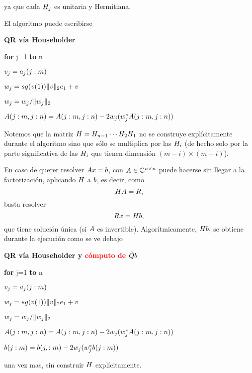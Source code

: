\begin{tcolorbox}
ya que cada $\Hbb_j$ es unitaria y Hermitiana.

El algoritmo puede escribirse

\begin{tcolorbox}[width=\linewidth*4/5]
\begin{center}
{\bf QR vía Householder}

\end{center}

{\bf for} j=1 {\bf to} n

\qquad $\vb_j=\ab_j(j:m)$

\qquad $\wb_j=sg(\vb(1))\|\vb\|_2\eb_1+\vb$

\qquad  $\wb_j=\wb_j/\|\wb_j \|_2$

\qquad  $\Ab(j:m,j:n)= \Ab(j:m,j:n)-2\wb_j(\wb_j^*\Ab(j:m,j:n))$
\end{tcolorbox}
Notemos que la matriz
$\Hbb=\Hbb_{n-1}\cdots \Hbb_2\Hbb_1$ no se construye explícitamente durante el algoritmo sino que sólo se multiplica por las $\Hbb_i$
(de hecho solo por la parte significativa de las  $\Hbb_i$ que tienen dimensión
$(m-i)\times (m-i)$).

En caso de querer resolver $\Ab x=\bb$, con $\Ab\in \Cnn$ puede hacerse sin llegar a la factorización, aplicando $\Hbb$ a $\bb$, es decir, como
$$
\Hbb\Ab=\Rb,
$$
basta resolver
$$
\Rb \xb= \Hbb \bb,
$$
que tiene solución única (si $\Ab$ es invertible). Algorítmicamente, $\Hbb \bb,$ se obtiene durante la ejecución como se ve debajo

\begin{tcolorbox}[width=\linewidth*4/5]
\begin{center}
{\bf QR vía Householder y \textcolor{red}{cómputo de $\tilde \Qb\bb$}}
\end{center}

{\bf for} j=1 {\bf to} n

\qquad $\vb_j=\ab_j(j:m)$

\qquad $\wb_j=sg(\vb(1))\|\vb\|_2\eb_1+\vb$

\qquad  $\wb_j=\wb_j/\|\wb_j \|_2$

\qquad  $\Ab(j:m,j:n)= \Ab(j:m,j:n)-2\wb_j(\wb_j^*\Ab(j:m,j:n))$

\qquad \textcolor{red}{$\bb(j:m)=\bb(j,:m)-2\wb_j(\wb_j^*\bb(j:m))$}
\end{tcolorbox}
una vez mas, sin construir $\Hbb$ explícitamente.


\end{tcolorbox}
